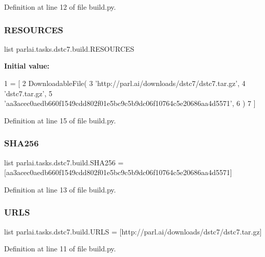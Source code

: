 Definition at line 12 of file build.\+py.

\mbox{\label{namespaceparlai_1_1tasks_1_1dstc7_1_1build_a55845a00d03206a66000322699e4dd1c}} 
\subsubsection{\texorpdfstring{R\+E\+S\+O\+U\+R\+C\+ES}{RESOURCES}}
{\footnotesize\ttfamily list parlai.\+tasks.\+dstc7.\+build.\+R\+E\+S\+O\+U\+R\+C\+ES}

{\bfseries Initial value\+:}
\begin{DoxyCode}
1 =  [
2     DownloadableFile(
3         \textcolor{stringliteral}{'http://parl.ai/downloads/dstc7/dstc7.tar.gz'},
4         \textcolor{stringliteral}{'dstc7.tar.gz'},
5         \textcolor{stringliteral}{'aa3acec0aedb660f1549cdd802f01e5bc9c5b9dc06f10764c5e20686aa4d5571'},
6     )
7 ]
\end{DoxyCode}


Definition at line 15 of file build.\+py.

\mbox{\label{namespaceparlai_1_1tasks_1_1dstc7_1_1build_a5c5b2722827737a3dbf5ca646754b3e8}} 
\subsubsection{\texorpdfstring{S\+H\+A256}{SHA256}}
{\footnotesize\ttfamily list parlai.\+tasks.\+dstc7.\+build.\+S\+H\+A256 = \mbox{[}\textquotesingle{}aa3acec0aedb660f1549cdd802f01e5bc9c5b9dc06f10764c5e20686aa4d5571\textquotesingle{}\mbox{]}}



Definition at line 13 of file build.\+py.

\mbox{\label{namespaceparlai_1_1tasks_1_1dstc7_1_1build_a4cbf3787ad68b1a3383bb9f2c35ead40}} 
\subsubsection{\texorpdfstring{U\+R\+LS}{URLS}}
{\footnotesize\ttfamily list parlai.\+tasks.\+dstc7.\+build.\+U\+R\+LS = \mbox{[}\textquotesingle{}http\+://parl.\+ai/downloads/dstc7/dstc7.\+tar.\+gz\textquotesingle{}\mbox{]}}



Definition at line 11 of file build.\+py.

